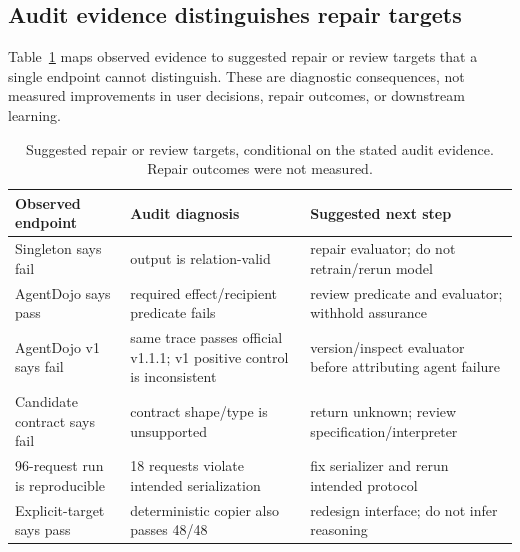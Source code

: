 \subsection{Audit evidence distinguishes repair targets}
Table~\ref{tab:decision-impact} maps observed evidence to suggested repair or review targets that a single endpoint cannot distinguish. These are diagnostic consequences, not measured improvements in user decisions, repair outcomes, or downstream learning.

\begin{table}[t]
\centering
\scriptsize
\caption{Suggested repair or review targets, conditional on the stated audit evidence. Repair outcomes were not measured.}
\label{tab:decision-impact}
\begin{tabular}{@{}p{}p{}p{}@{}}
\toprule
Observed endpoint & Audit diagnosis & Suggested next step \\
\midrule
Singleton says fail & output is relation-valid & repair evaluator; do not retrain/rerun model \\
AgentDojo says pass & required effect/recipient predicate fails & review predicate and evaluator; withhold assurance \\
AgentDojo v1 says fail & same trace passes official v1.1.1; v1 positive control is inconsistent & version/inspect evaluator before attributing agent failure \\
Candidate contract says fail & contract shape/type is unsupported & return unknown; review specification/interpreter \\
96-request run is reproducible & 18 requests violate intended serialization & fix serializer and rerun intended protocol \\
Explicit-target says pass & deterministic copier also passes 48/48 & redesign interface; do not infer reasoning \\
\bottomrule
\end{tabular}
\end{table}

